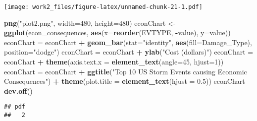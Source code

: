 \documentclass[]{article}
\newenvironment{Shaded}{\begin{snugshade}}{\end{snugshade}}
\newcommand{\DataTypeTok}[1]{\textcolor[rgb]{0.13,0.29,0.53}{#1}}
\newcommand{\DecValTok}[1]{\textcolor[rgb]{0.00,0.00,0.81}{#1}}
\newcommand{\FloatTok}[1]{\textcolor[rgb]{0.00,0.00,0.81}{#1}}
\newcommand{\KeywordTok}[1]{\textcolor[rgb]{0.13,0.29,0.53}{\textbf{#1}}}
\newcommand{\NormalTok}[1]{#1}
\newcommand{\OperatorTok}[1]{\textcolor[rgb]{0.81,0.36,0.00}{\textbf{#1}}}
\newcommand{\StringTok}[1]{\textcolor[rgb]{0.31,0.60,0.02}{#1}}
\begin{document}
\texttt{[image: work2\_files/figure-latex/unnamed-chunk-21-1.pdf]}

\begin{Shaded}
\begin{Highlighting}[]
\KeywordTok{png}\NormalTok{(}\StringTok{"plot2.png"}\NormalTok{, }\DataTypeTok{width=}\DecValTok{480}\NormalTok{, }\DataTypeTok{height=}\DecValTok{480}\NormalTok{)}
\NormalTok{econChart <-}\StringTok{ }\KeywordTok{ggplot}\NormalTok{(econ_consequences, }\KeywordTok{aes}\NormalTok{(}\DataTypeTok{x=}\KeywordTok{reorder}\NormalTok{(EVTYPE, }\OperatorTok{-}\NormalTok{value), }\DataTypeTok{y=}\NormalTok{value))}
\NormalTok{econChart =}\StringTok{ }\NormalTok{econChart }\OperatorTok{+}\StringTok{ }\KeywordTok{geom_bar}\NormalTok{(}\DataTypeTok{stat=}\StringTok{"identity"}\NormalTok{, }\KeywordTok{aes}\NormalTok{(}\DataTypeTok{fill=}\NormalTok{Damage_Type), }\DataTypeTok{position=}\StringTok{"dodge"}\NormalTok{)}
\NormalTok{econChart =}\StringTok{ }\NormalTok{econChart }\OperatorTok{+}\StringTok{ }\KeywordTok{ylab}\NormalTok{(}\StringTok{"Cost (dollars)"}\NormalTok{) }
\NormalTok{econChart =}\StringTok{ }\NormalTok{econChart }\OperatorTok{+}\StringTok{ }\KeywordTok{theme}\NormalTok{(}\DataTypeTok{axis.text.x =} \KeywordTok{element_text}\NormalTok{(}\DataTypeTok{angle=}\DecValTok{45}\NormalTok{, }\DataTypeTok{hjust=}\DecValTok{1}\NormalTok{))}
\NormalTok{econChart =}\StringTok{ }\NormalTok{econChart }\OperatorTok{+}\StringTok{ }\KeywordTok{ggtitle}\NormalTok{(}\StringTok{"Top 10 US Storm Events causing Economic Consequences"}\NormalTok{) }\OperatorTok{+}\StringTok{ }\KeywordTok{theme}\NormalTok{(}\DataTypeTok{plot.title =} \KeywordTok{element_text}\NormalTok{(}\DataTypeTok{hjust =} \FloatTok{0.5}\NormalTok{))}
\NormalTok{econChart}
\KeywordTok{dev.off}\NormalTok{()}
\end{Highlighting}
\end{Shaded}

\begin{verbatim}
## pdf 
##   2
\end{verbatim}
\end{document}
